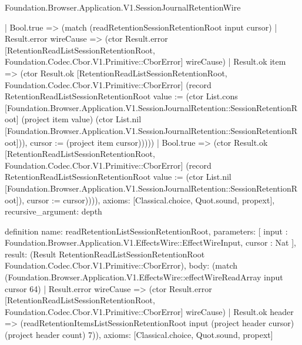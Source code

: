 \begin{lexlean}{Foundation.Browser.Application.V1.SessionJournalRetentionWire}
\begin{semanticmodule}
{{        }
        | Bool.true => (match (readRetentionSessionRetentionRoot input cursor)
          | Result.error wireCause => (ctor Result.error [RetentionReadListSessionRetentionRoot, Foundation.Codec.Cbor.V1.Primitive::CborError] wireCause)
          | Result.ok item => (ctor Result.ok [RetentionReadListSessionRetentionRoot, Foundation.Codec.Cbor.V1.Primitive::CborError] (record RetentionReadListSessionRetentionRoot {value := (ctor List.cons [Foundation.Browser.Application.V1.SessionJournalRetention::SessionRetentionRoot] (project item value) (ctor List.nil [Foundation.Browser.Application.V1.SessionJournalRetention::SessionRetentionRoot])), cursor := (project item cursor)}))))
      | Bool.true => (ctor Result.ok [RetentionReadListSessionRetentionRoot, Foundation.Codec.Cbor.V1.Primitive::CborError] (record RetentionReadListSessionRetentionRoot {value := (ctor List.nil [Foundation.Browser.Application.V1.SessionJournalRetention::SessionRetentionRoot]), cursor := cursor})))),
  axioms: [Classical.choice, Quot.sound, propext],
  recursive_argument: depth
}

definition{
  name: readRetentionListSessionRetentionRoot,
  parameters: [
    input : Foundation.Browser.Application.V1.EffectsWire::EffectWireInput,
    cursor : Nat
  ],
  result: (Result RetentionReadListSessionRetentionRoot Foundation.Codec.Cbor.V1.Primitive::CborError),
  body: (match (Foundation.Browser.Application.V1.EffectsWire::effectWireReadArray input cursor 64)
    | Result.error wireCause => (ctor Result.error [RetentionReadListSessionRetentionRoot, Foundation.Codec.Cbor.V1.Primitive::CborError] wireCause)
    | Result.ok header => (readRetentionItemsListSessionRetentionRoot input (project header cursor) (project header count) 7)),
  axioms: [Classical.choice, Quot.sound, propext]
}


\end{semanticmodule}
\end{lexlean}
